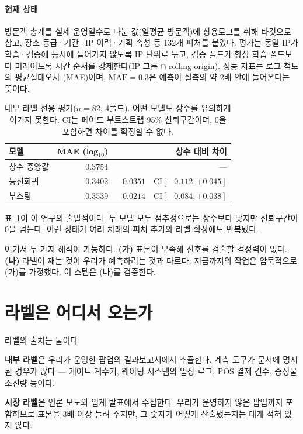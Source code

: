 \documentclass[10pt]{article}
\begin{document}
\paragraph{현재 상태}
방문객 총계를 실제 운영일수로 나눈 값(일평균 방문객)에 상용로그를 취해 타깃으로 삼고,
장소 등급·기간·IP 이력·기획 속성 등 132개 피처를 붙였다. 평가는 동일 IP가 학습·검증에
동시에 들어가지 않도록 IP 단위로 묶고, 검증 폴드가 항상 학습 폴드보다 미래이도록
시간 순서를 강제한다(IP-그룹 $\cap$ rolling-origin). 성능 지표는 로그 척도의 평균절대오차
(MAE)이며, $\text{MAE}=0.3$은 예측이 실측의 약 2배 안에 들어온다는 뜻이다.

\begin{table}[t]\centering\tsize
\caption{내부 라벨 전용 평가($n{=}82$, 4폴드). 어떤 모델도 상수를 유의하게 이기지 못한다.
CI는 페어드 부트스트랩 95\% 신뢰구간이며, 0을 포함하면 차이를 확정할 수 없다.}
\label{tab:baseline}
\begin{tabular}{lrr}
\toprule
모델 & MAE (log$_{10}$) & 상수 대비 차이 \\
\midrule
상수 중앙값 & 0.3754 & --- \\
능선회귀 & 0.3402 & $-0.0351$\ \ CI$[-0.112,+0.045]$ \\
부스팅 & 0.3539 & $-0.0214$\ \ CI$[-0.084,+0.038]$ \\
\bottomrule
\end{tabular}
\end{table}

표~\ref{tab:baseline}이 이 연구의 출발점이다. 두 모델 모두 점추정으로는 상수보다 낫지만
신뢰구간이 0을 넘는다. 이런 상태가 여러 차례의 피처 추가와 라벨 확장에도 반복됐다.

여기서 두 가지 해석이 가능하다.
\textbf{(가)} 표본이 부족해 신호를 검출할 검정력이 없다.
\textbf{(나)} 라벨이 재는 것이 우리가 예측하려는 것과 다르다.
지금까지의 작업은 암묵적으로 (가)를 가정했다. 이 스텝은 (나)를 검증한다.

\section{라벨은 어디서 오는가}

라벨의 출처는 둘이다.

\textbf{내부 라벨}은 우리가 운영한 팝업의 결과보고서에서 추출한다. 계측 도구가 문서에
명시된 경우가 많다 --- 게이트 계수기, 웨이팅 시스템의 입장 로그, POS 결제 건수,
증정물 소진량 등이다.

\textbf{시장 라벨}은 언론 보도와 업계 발표에서 수집한다. 우리가 운영하지 않은 팝업까지
포함하므로 표본을 3배 이상 늘려 주지만, 그 숫자가 어떻게 산출됐는지는 대개 적혀 있지 않다.
\end{document}
